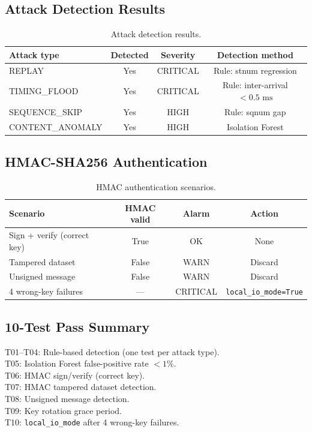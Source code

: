 \documentclass[11pt, a4paper]{article}
\newcommand{\ms}{\,\text{ms}}
\newcommand{\cmark}{\ding{51}}
\begin{document}
\subsection{Attack Detection Results}

\begin{table}[ht]
\centering
\caption{Attack detection results.}
\label{tab:attacks}
\begin{tabular}{lccc}
\toprule
Attack type & Detected & Severity & Detection method \\
\midrule
REPLAY         & \cmark Yes & CRITICAL & Rule: stnum regression \\
TIMING\_FLOOD  & \cmark Yes & CRITICAL & Rule: inter-arrival $< 0.5\,\ms$ \\
SEQUENCE\_SKIP & \cmark Yes & HIGH     & Rule: sqnum gap \\
CONTENT\_ANOMALY & \cmark Yes & HIGH   & Isolation Forest \\
\bottomrule
\end{tabular}
\end{table}

\subsection{HMAC-SHA256 Authentication}

\begin{table}[ht]
\centering
\caption{HMAC authentication scenarios.}
\label{tab:hmac}
\begin{tabular}{lccc}
\toprule
Scenario & HMAC valid & Alarm & Action \\
\midrule
Sign + verify (correct key) & True & OK & None \\
Tampered dataset & False & WARN & Discard \\
Unsigned message & False & WARN & Discard \\
\midrule
4 wrong-key failures & --- & CRITICAL & \texttt{local\_io\_mode=True} \\
\bottomrule
\end{tabular}
\end{table}

\subsection{10-Test Pass Summary}

T01--T04: Rule-based detection (one test per attack type). \cmark\\
T05: Isolation Forest false-positive rate $< 1\%$. \cmark\\
T06: HMAC sign/verify (correct key). \cmark\\
T07: HMAC tampered dataset detection. \cmark\\
T08: Unsigned message detection. \cmark\\
T09: Key rotation grace period. \cmark\\
T10: \texttt{local\_io\_mode} after 4 wrong-key failures. \cmark
\end{document}
